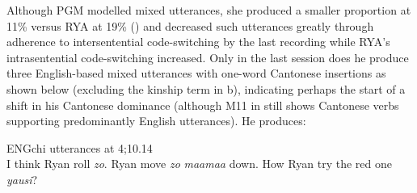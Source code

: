 \documentclass[output=paper,colorlinks,citecolor=brown]{langscibook}
\begin{document}
Although PGM modelled mixed utterances, she produced a smaller proportion at 11\% versus RYA at 19\% () and decreased such utterances greatly through adherence to intersentential code-switching by the last recording while RYA’s intrasentential code-switching increased. Only in the last session does he produce three English-based mixed utterances with one-word Cantonese insertions as shown below (excluding the kinship term in b), indicating perhaps the start of a shift in his Cantonese dominance (although M11 in  still shows Cantonese verbs supporting predominantly English utterances). He produces:

\ea
ENGchi utterances at 4;10.14\\
    \ea I think Ryan roll \textit{zo}.
    \ex Ryan move \textit{zo} \textit{maamaa} down.
    \ex How Ryan try the red one \textit{yausi}?
    \z
\z
\end{document}
